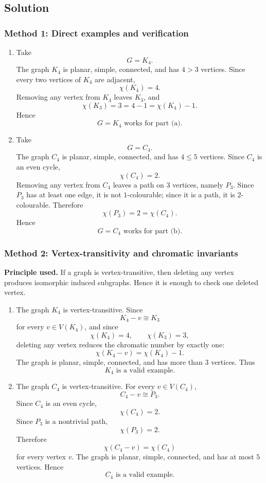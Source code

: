 \documentclass[12pt]{article}
\begin{document}
\subsection{Solution}

\subsubsection{Method 1: Direct examples and verification}
\begin{enumerate}[label=(\alph*)]
  \item Take
  \[
  G=K_4.
  \]
  The graph $K_4$ is planar, simple, connected, and has $4>3$ vertices. Since every two vertices of $K_4$ are adjacent,
  \[
  \chi(K_4)=4.
  \]
  Removing any vertex from $K_4$ leaves $K_3$, and
  \[
  \chi(K_3)=3=4-1=\chi(K_4)-1.
  \]
  Hence
  \[
  \boxed{G=K_4\text{ works for part (a).}}
  \]

  \item Take
  \[
  G=C_4.
  \]
  The graph $C_4$ is planar, simple, connected, and has $4\le 5$ vertices. Since $C_4$ is an even cycle,
  \[
  \chi(C_4)=2.
  \]
  Removing any vertex from $C_4$ leaves a path on $3$ vertices, namely $P_3$. Since $P_3$ has at least one edge, it is not $1$-colourable; since it is a path, it is $2$-colourable. Therefore
  \[
  \chi(P_3)=2=\chi(C_4).
  \]
  Hence
  \[
  \boxed{G=C_4\text{ works for part (b).}}
  \]
\end{enumerate}

\subsubsection{Method 2: Vertex-transitivity and chromatic invariants}
\textbf{Principle used.} If a graph is vertex-transitive, then deleting any vertex produces isomorphic induced subgraphs. Hence it is enough to check one deleted vertex.

\begin{enumerate}[label=(\alph*)]
  \item The graph $K_4$ is vertex-transitive. Since
  \[
  K_4-v\cong K_3
  \]
  for every $v\in V(K_4)$, and since
  \[
  \chi(K_4)=4,
  \qquad
  \chi(K_3)=3,
  \]
  deleting any vertex reduces the chromatic number by exactly one:
  \[
  \chi(K_4-v)=\chi(K_4)-1.
  \]
  The graph is planar, simple, connected, and has more than $3$ vertices. Thus
  \[
  \boxed{K_4\text{ is a valid example.}}
  \]

  \item The graph $C_4$ is vertex-transitive. For every $v\in V(C_4)$,
  \[
  C_4-v\cong P_3.
  \]
  Since $C_4$ is an even cycle,
  \[
  \chi(C_4)=2.
  \]
  Since $P_3$ is a nontrivial path,
  \[
  \chi(P_3)=2.
  \]
  Therefore
  \[
  \chi(C_4-v)=\chi(C_4)
  \]
  for every vertex $v$. The graph is planar, simple, connected, and has at most $5$ vertices. Hence
  \[
  \boxed{C_4\text{ is a valid example.}}
  \]
\end{enumerate}
\end{document}
